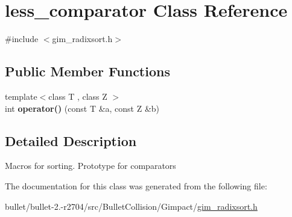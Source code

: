 \hypertarget{classless__comparator}{\section{less\+\_\+comparator Class Reference}
\label{classless__comparator}
}


{\ttfamily \#include $<$gim\+\_\+radixsort.\+h$>$}

\subsection*{Public Member Functions}
\begin{DoxyCompactItemize}
\item 
\hypertarget{classless__comparator_a77c7b11d72818c9d1219b1a5ef615e60}{{\footnotesize template$<$class T , class Z $>$ }\\int {\bfseries operator()} (const T \&a, const Z \&b)}\label{classless__comparator_a77c7b11d72818c9d1219b1a5ef615e60}

\end{DoxyCompactItemize}


\subsection{Detailed Description}
Macros for sorting. Prototype for comparators 

The documentation for this class was generated from the following file\+:\begin{DoxyCompactItemize}
\item 
bullet/bullet-\/2.-\/r2704/src/\+Bullet\+Collision/\+Gimpact/\hyperlink{gim__radixsort_8h}{gim\+\_\+radixsort.\+h}\end{DoxyCompactItemize}
